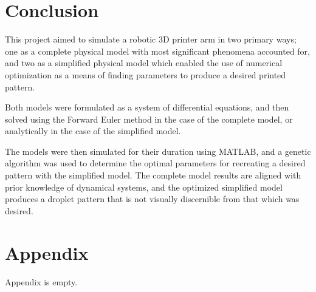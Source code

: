 \documentclass[a4paper,12pt]{report}
\begin{document}
\section{Conclusion}
This project aimed to simulate a robotic 3D printer arm in two primary ways; one as a complete physical model with most significant phenomena accounted for, and two as a simplified physical model which enabled the use of numerical optimization as a means of finding parameters to produce a desired printed pattern.

Both models were formulated as a system of differential equations, and then solved using the Forward Euler method in the case of the complete model, or analytically in the case of the simplified model.

The models were then simulated for their duration using MATLAB, and a genetic algorithm was used to determine the optimal parameters for recreating a desired pattern with the simplified model. The complete model results are aligned with prior knowledge of dynamical systems, and the optimized simplified model produces a droplet pattern that is not visually discernible from that which was desired.


\section{Appendix}
Appendix is empty.
\end{document}
